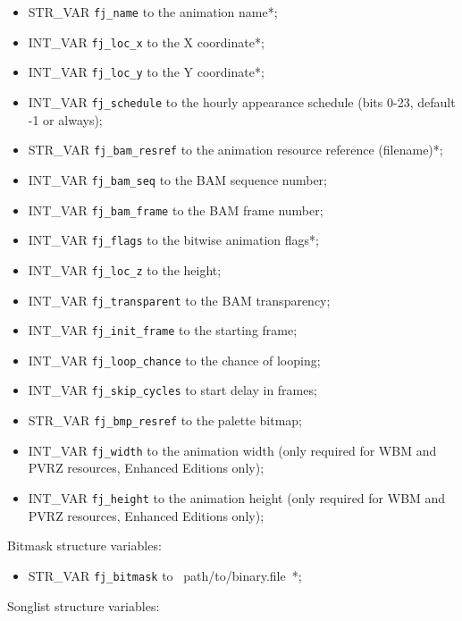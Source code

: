 \documentclass{article}
\begin{document}
\begin{itemize}
\item STR_VAR \verb+fj_name+ to the animation name*;
\item INT_VAR \verb+fj_loc_x+ to the X coordinate*;
\item INT_VAR \verb+fj_loc_y+ to the Y coordinate*;
\item INT_VAR \verb+fj_schedule+ to the hourly appearance schedule (bits 0-23, default -1 or always);
\item STR_VAR \verb+fj_bam_resref+ to the animation resource reference (filename)*;
\item INT_VAR \verb+fj_bam_seq+ to the BAM sequence number;
\item INT_VAR \verb+fj_bam_frame+ to the BAM frame number;
\item INT_VAR \verb+fj_flags+ to the bitwise animation flags*;
\item INT_VAR \verb+fj_loc_z+ to the height;
\item INT_VAR \verb+fj_transparent+ to the BAM transparency;
\item INT_VAR \verb+fj_init_frame+ to the starting frame;
\item INT_VAR \verb+fj_loop_chance+ to the chance of looping;
\item INT_VAR \verb+fj_skip_cycles+ to start delay in frames;
\item STR_VAR \verb+fj_bmp_resref+ to the palette bitmap;
\item INT_VAR \verb+fj_width+ to the animation width (only required for WBM and PVRZ resources, Enhanced Editions only);
\item INT_VAR \verb+fj_height+ to the animation height (only required for WBM and PVRZ resources, Enhanced Editions only);
\end{itemize}
Bitmask structure variables:
\begin{itemize}
\item STR_VAR \verb+fj_bitmask+ to ~path/to/binary.file~*;
\end{itemize}
Songlist structure variables:
\end{document}
